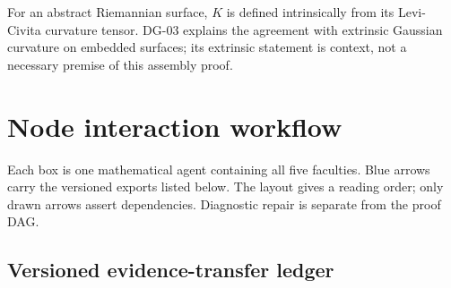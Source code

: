 \documentclass[preprint,12pt,aps,pra,showkeys,amsmath,amssymb,superscriptaddress,floatfix]{revtex4-2}
\theoremstyle{definition}
\theoremstyle{remark}
\begin{document}
For an abstract Riemannian surface, \(K\) is defined intrinsically from
its Levi-Civita curvature tensor. DG-03 explains the agreement with
extrinsic Gaussian curvature on embedded surfaces; its extrinsic
statement is context, not a necessary premise of this assembly proof.

\clearpage\section{Node interaction workflow}

\begin{center}\end{center}

Each box is one mathematical agent containing all five faculties. Blue
arrows carry the versioned exports listed below. The layout gives a
reading order; only drawn arrows assert dependencies. Diagnostic repair
is separate from the proof DAG.

\subsection{Versioned evidence-transfer ledger}

\begingroup\small\linespread{1.05}\selectfont
\end{document}
